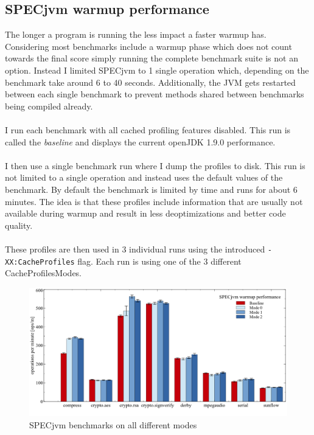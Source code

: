 \subsection{SPECjvm warmup performance}
\label{s:perf_specjvm_warmup}
The longer a program is running the less impact a faster warmup has. Considering most benchmarks include a warmup phase which does not count towards the final score simply running the complete benchmark suite is not an option.
Instead I limited SPECjvm to 1 single operation which, depending on the benchmark take around 6 to 40 seconds.
Additionally, the JVM gets restarted between each single benchmark to prevent methods shared between benchmarks being compiled already.
\\\\
I run each benchmark with all cached profiling features disabled. This run is called the \textit{baseline} and displays the current openJDK 1.9.0 performance.    
\\\\ 
I then use a single benchmark run where I dump the profiles to disk. This run is not limited to a single operation and instead uses the default values of the benchmark. By default the benchmark is limited by time and runs for about 6 minutes. The idea is that these profiles include information that are usually not available during warmup and result in less deoptimizations and better code quality.
\\\\
These profiles are then used in 3 individual runs using the introduced \texttt{-XX:CacheProfiles} flag. Each run is using one of the 3 different CacheProfilesModes.
\begin{figure}[ht]
  \begin{center}
    \centering
    \includegraphics[width=1.0\textwidth]{figures/others_warmup.png}
    \caption{SPECjvm benchmarks on all different modes}
    \label{f:others_warmup}
  \end{center}
\end{figure}
